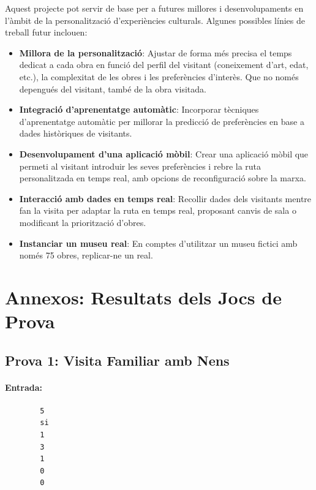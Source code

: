 \documentclass[a4paper]{article}
\begin{document}
	Aquest projecte pot servir de base per a futures millores i desenvolupaments en l'àmbit de la personalització d'experiències culturals. Algunes possibles línies de treball futur inclouen:
	
	\begin{itemize}
		\item \textbf{Millora de la personalització}: Ajustar de forma més precisa el temps dedicat a cada obra en funció del perfil del visitant (coneixement d'art, edat, etc.), la complexitat de les obres i les preferències d'interès. Que no només depengués del visitant, també de la obra visitada.
		\item \textbf{Integració d'aprenentatge automàtic}: Incorporar tècniques d'aprenentatge automàtic per millorar la predicció de preferències en base a dades històriques de visitants.
		\item \textbf{Desenvolupament d'una aplicació mòbil}: Crear una aplicació mòbil que permeti al visitant introduir les seves preferències i rebre la ruta personalitzada en temps real, amb opcions de reconfiguració sobre la marxa.
		\item \textbf{Interacció amb dades en temps real}: Recollir dades dels visitants mentre fan la visita per adaptar la ruta en temps real, proposant canvis de sala o modificant la priorització d'obres.
		\item \textbf{Instanciar un museu real}: En comptes d'utilitzar un museu fictici amb només 75 obres, replicar-ne un real.
	\end{itemize}
	
	\newpage
	\section{Annexos: Resultats dels Jocs de Prova}
	\subsection{Prova 1: Visita Familiar amb Nens}
	\paragraph{Entrada:}
	
	\begin{verbatim}
		5
		si
		1
		3
		1
		0
		0
	\end{verbatim}
	
\end{document}

